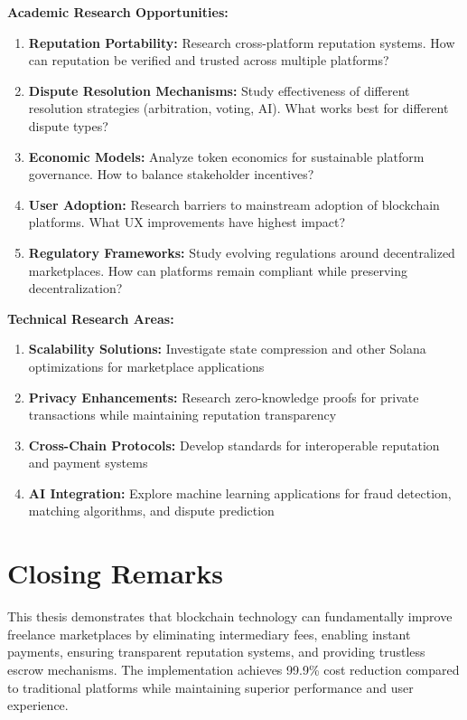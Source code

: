 \documentclass[a4paper,13pt,twoside]{report}
\theoremstyle{definition}
\begin{document}
\textbf{Academic Research Opportunities:}
\begin{enumerate}
    \item \textbf{Reputation Portability:} Research cross-platform reputation systems. How can reputation be verified and trusted across multiple platforms?

    \item \textbf{Dispute Resolution Mechanisms:} Study effectiveness of different resolution strategies (arbitration, voting, AI). What works best for different dispute types?

    \item \textbf{Economic Models:} Analyze token economics for sustainable platform governance. How to balance stakeholder incentives?

    \item \textbf{User Adoption:} Research barriers to mainstream adoption of blockchain platforms. What UX improvements have highest impact?

    \item \textbf{Regulatory Frameworks:} Study evolving regulations around decentralized marketplaces. How can platforms remain compliant while preserving decentralization?
\end{enumerate}

\textbf{Technical Research Areas:}
\begin{enumerate}
    \item \textbf{Scalability Solutions:} Investigate state compression and other Solana optimizations for marketplace applications

    \item \textbf{Privacy Enhancements:} Research zero-knowledge proofs for private transactions while maintaining reputation transparency

    \item \textbf{Cross-Chain Protocols:} Develop standards for interoperable reputation and payment systems

    \item \textbf{AI Integration:} Explore machine learning applications for fraud detection, matching algorithms, and dispute prediction
\end{enumerate}

\section{Closing Remarks}

This thesis demonstrates that blockchain technology can fundamentally improve freelance marketplaces by eliminating intermediary fees, enabling instant payments, ensuring transparent reputation systems, and providing trustless escrow mechanisms. The implementation achieves 99.9\% cost reduction compared to traditional platforms while maintaining superior performance and user experience.
\end{document}
